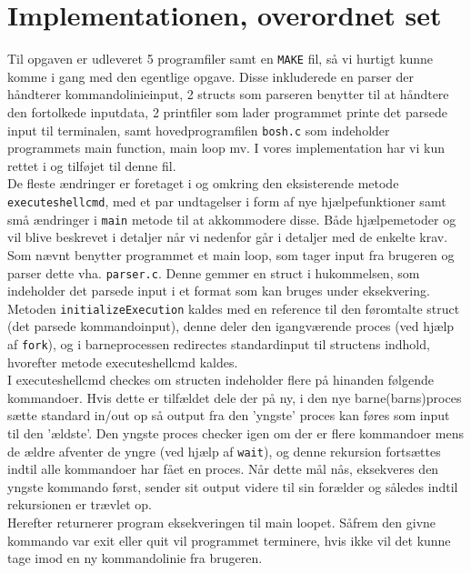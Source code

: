\documentclass{article}
\begin{document}
\section{Implementationen, overordnet set}
Til opgaven er udleveret 5 programfiler samt en \texttt{MAKE} fil, så vi hurtigt kunne komme i gang med den egentlige opgave. Disse inkluderede en parser der håndterer kommandolinieinput, 2 structs som parseren benytter til at håndtere den fortolkede inputdata, 2 printfiler som lader programmet printe det parsede input til terminalen, samt hovedprogramfilen \texttt{bosh.c} som indeholder programmets main function, main loop mv. I vores implementation har vi kun rettet i og tilføjet til denne fil.\\

De fleste ændringer er foretaget i og omkring den eksisterende metode \texttt{executeshellcmd}, med et par undtagelser i form af nye hjælpefunktioner samt små ændringer i \texttt{main} metode til at akkommodere disse. Både hjælpemetoder og vil blive beskrevet i detaljer når vi nedenfor går i detaljer med de enkelte krav.\\

Som nævnt benytter programmet et main loop, som tager input fra brugeren og parser dette vha. \texttt{parser.c}. Denne gemmer en struct i hukommelsen, som indeholder det parsede input i et format som kan bruges under eksekvering. Metoden \texttt{initializeExecution} kaldes med en reference til den føromtalte struct (det parsede kommandoinput), denne deler den igangværende proces (ved hjælp af \texttt{fork}), og i barneprocessen redirectes standardinput til structens indhold, hvorefter metode executeshellcmd kaldes.\\

I executeshellcmd checkes om structen indeholder flere på hinanden følgende kommandoer. Hvis dette er tilfældet dele der på ny, i den nye barne(barns)proces sætte standard in/out op så output fra den 'yngste' proces kan føres som input til den 'ældste'. Den yngste proces checker igen om der er flere kommandoer mens de ældre afventer de yngre (ved hjælp af \texttt{wait}), og denne rekursion fortsættes indtil alle kommandoer har fået en proces. Når dette mål nås, eksekveres den yngste kommando først, sender sit output videre til sin forælder og således indtil rekursionen er trævlet op.\\

Herefter returnerer program eksekveringen til main loopet. Såfrem den givne kommando var exit eller quit vil programmet terminere, hvis ikke vil det kunne tage imod en ny kommandolinie fra brugeren.\\
\end{document}

